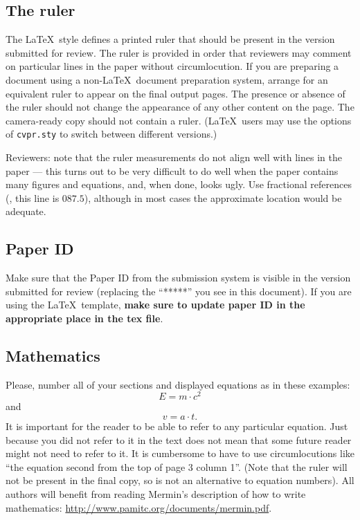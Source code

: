 \subsection{The ruler}
The \LaTeX\ style defines a printed ruler that should be present in the version submitted for review.
The ruler is provided in order that reviewers may comment on particular lines in the paper without circumlocution.
If you are preparing a document using a non-\LaTeX\ document preparation system, arrange for an equivalent ruler to appear on the final output pages.
The presence or absence of the ruler should not change the appearance of any other content on the page.
The camera-ready copy should not contain a ruler.
(\LaTeX\ users may use the options of \texttt{cvpr.sty} to switch between different versions.)

Reviewers:
note that the ruler measurements do not align well with lines in the paper --- this turns out to be very difficult to do well when the paper contains many figures and equations, and, when done, looks ugly.
Use fractional references (\eg, this line is $087.5$), although in most cases the approximate location would be adequate.


\subsection{Paper ID}
Make sure that the Paper ID from the submission system is visible in the version submitted for review (replacing the ``*****'' you see in this document).
If you are using the \LaTeX\ template, \textbf{make sure to update paper ID in the appropriate place in the tex file}.


\subsection{Mathematics}

Please, number all of your sections and displayed equations as in these examples:
\begin{equation}
  E = m\cdot c^2
  \label{eq:important}
\end{equation}
and
\begin{equation}
  v = a\cdot t.
  \label{eq:also-important}
\end{equation}
It is important for the reader to be able to refer to any particular equation.
Just because you did not refer to it in the text does not mean that some future reader might not need to refer to it.
It is cumbersome to have to use circumlocutions like ``the equation second from the top of page 3 column 1''.
(Note that the ruler will not be present in the final copy, so is not an alternative to equation numbers).
All authors will benefit from reading Mermin's description of how to write mathematics:
\url{http://www.pamitc.org/documents/mermin.pdf}.

